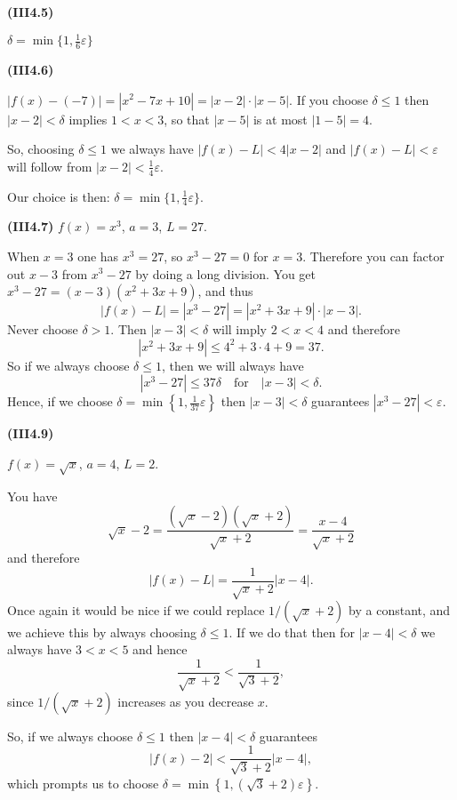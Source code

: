 \documentclass[openany,reqno]{amsbook}
\begin{document}
\begin{trivlist}
\item[{\bf(III4.5)}]

  $\delta = \min \bigl\{1, \frac16\varepsilon\bigr\}$
  \bigskip

\item[{\bf(III4.6)}]

  $|f(x) - (-7) |=|x^2-7x+10| = |x-2|\cdot|x-5| $.  If you choose
  $\delta\leq 1$ then $|x-2|<\delta$ implies $1<x<3$, so that $|x-5|$
  is at most $|1-5| = 4$.

  So, choosing $\delta\leq 1$ we always have $|f(x) - L|<4|x-2|$ and
  $|f(x) - L|<\varepsilon$ will follow from $|x-2|<\frac14\varepsilon$.

  Our choice is then: $\delta = \min \bigl\{1, \frac14\varepsilon
  \bigr\}$.
  \bigskip

\item[{\bf(III4.7)}]
  $f(x) = x^3$, $a=3$, $L=27$.

  When $x=3$ one has $x^3=27$, so $x^3-27=0$ for $x=3$.  Therefore you
  can factor out $x-3$ from $x^3-27$ by doing a long division.  You get
  $x^3-27 = (x-3)(x^2+3x+9)$, and thus
  \[
    |f(x) - L| = |x^3-27| =|x^2+3x+9|\cdot|x-3|.
  \]
  Never choose $\delta>1$.  Then $|x-3|<\delta$ will imply $2<x<4$ and
  therefore
  \[
    |x^2+3x+9| \leq 4^2+3\cdot4+9 = 37.
  \]
  So if we always choose $\delta\leq 1$, then we will always have
  \[
    |x^3-27|\leq 37\delta \quad\text{for}\quad |x-3|<\delta.
  \]
  Hence, if we choose $\delta=\min\left\{ 1, \tfrac1{37}\varepsilon
  \right\}$ then $|x-3|<\delta$ guarantees $|x^3-27| < \varepsilon$.


  \bigskip

\item[{\bf(III4.9)}]

  $f(x) = \sqrt x$, $a=4$, $L=2$.

  You have
  \[
    \sqrt x - 2 = \frac{(\sqrt x-2)(\sqrt x +2)}{\sqrt x +2}
    =\frac{x-4}{\sqrt x+2}
  \]
  and therefore
  \begin{equation}\label{eq:03sol-fx-L-estimate}
    |f(x) - L | = \frac{1}{\sqrt x+2}|x-4|.
  \end{equation}
  Once again it would be nice if we could replace $1/(\sqrt x + 2)$ by
  a constant, and we achieve this by always choosing $\delta\leq 1$.
  If we do that then for $|x-4|<\delta$ we always have $3<x<5$ and
  hence
  \[
    \frac{1}{\sqrt x+2} < \frac{1}{\sqrt 3 +2},
  \]
  since $1/(\sqrt x+ 2)$ increases as you decrease $x$.

  So, if we always choose $\delta\leq 1$ then $|x-4|<\delta$ guarantees
  \[
    |f(x)-2| < \frac1{\sqrt3 +2}|x-4|,
  \]
  which prompts us to choose $\delta = \min\left\{ 1, (\sqrt
  3+2)\varepsilon \right\}$.


\end{trivlist}
\end{document}
